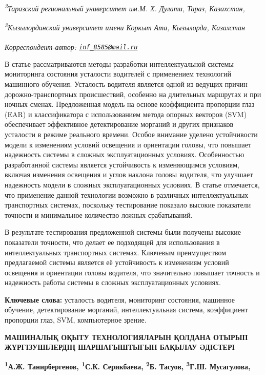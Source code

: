 \emph{\textsuperscript{2}Таразский региональный университет им.М. Х.
Дулати, Тараз, Казахстан,}

\emph{\textsuperscript{3}Кызылординский университет имени Коркыт Ата,
Кызылорда, Казахстан}

{\bfseries \textsuperscript{\envelope }}\emph{Корреспондент-автор:
\href{mailto:inf_8585@mail.ru}{\nolinkurl{inf\_8585@mail.ru}}}

В статье рассматриваются методы разработки интеллектуальной системы
мониторинга состояния усталости водителей с применением технологий
машинного обучения. Усталость водителя является одной из ведущих причин
дорожно-транспортных происшествий, особенно на длительных маршрутах и
при ночных сменах. Предложенная модель на основе коэффициента пропорции
глаз (EAR) и классификатора с использованием метода опорных векторов
(SVM) обеспечивает эффективное детектирование морганий и других
признаков усталости в режиме реального времени. Особое внимание уделено
устойчивости модели к изменениям условий освещения и ориентации головы,
что повышает надежность системы в сложных эксплуатационных условиях.
Особенностью разработанной системы является устойчивость к изменяющимся
условиям, включая изменения освещения и углов наклона головы водителя,
что улучшает надежность модели в сложных эксплуатационных условиях. В
статье отмечается, что применение данной технологии возможно в различных
интеллектуальных транспортных системах, поскольку тестирование показало
высокие показатели точности и минимальное количество ложных
срабатываний.

В результате тестирования предложенной системы были получены высокие
показатели точности, что делает ее подходящей для использования в
интеллектуальных транспортных системах. Ключевым преимуществом
предлагаемой системы является её устойчивость к изменениям условий
освещения и ориентации головы водителя, что значительно повышает
точность и надежность работы системы в сложных эксплуатационных
условиях.

{\bfseries Ключевые слова:} усталость водителя, мониторинг состояния,
машинное обучение, детектирование морганий, интеллектуальная система,
коэффициент пропорции глаз, SVM, компьютерное зрение.

{\bfseries МАШИНАЛЫҚ ОҚЫТУ ТЕХНОЛОГИЯЛАРЫН ҚОЛДАНА ОТЫРЫП ЖҮРГІЗУШІЛЕРДІҢ
ШАРШАҒЫШТЫҒЫН БАҚЫЛАУ ӘДІСТЕРІ}

{\bfseries \textsuperscript{1}А.Ж. Танирбергенов, \textsuperscript{1}С.К.
Серикбаева\textsuperscript{\envelope }, \textsuperscript{2}Б. Тасуов,
\textsuperscript{3}Г.Ш. Мусагулова,}


